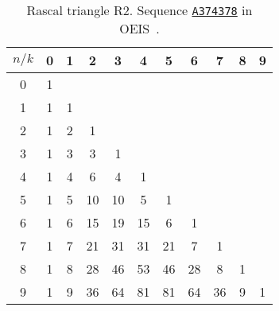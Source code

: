 \begin{table}[H]
    \begin{center}
        \begin{tabular}{c|cccccccccc}
            $n/k$ & 0 & 1 & 2  & 3  & 4  & 5  & 6  & 7  & 8 & 9 \\
            \hline
            0     & 1 &   &    &    &    &    &    &    &   &   \\
            1     & 1 & 1 &    &    &    &    &    &    &   &   \\
            2     & 1 & 2 & 1  &    &    &    &    &    &   &   \\
            3     & 1 & 3 & 3  & 1  &    &    &    &    &   &   \\
            4     & 1 & 4 & 6  & 4  & 1  &    &    &    &   &   \\
            5     & 1 & 5 & 10 & 10 & 5  & 1  &    &    &   &   \\
            6     & 1 & 6 & 15 & 19 & 15 & 6  & 1  &    &   &   \\
            7     & 1 & 7 & 21 & 31 & 31 & 21 & 7  & 1  &   &   \\
            8     & 1 & 8 & 28 & 46 & 53 & 46 & 28 & 8  & 1 &   \\
            9     & 1 & 9 & 36 & 64 & 81 & 81 & 64 & 36 & 9 & 1
        \end{tabular}
    \end{center}
    \caption{Rascal triangle R2. Sequence \href{https://oeis.org/A374378}{\texttt{A374378}} in OEIS~\cite{sloane2003oeis}.}
    \label{tab:r2-triangle}
\end{table}
